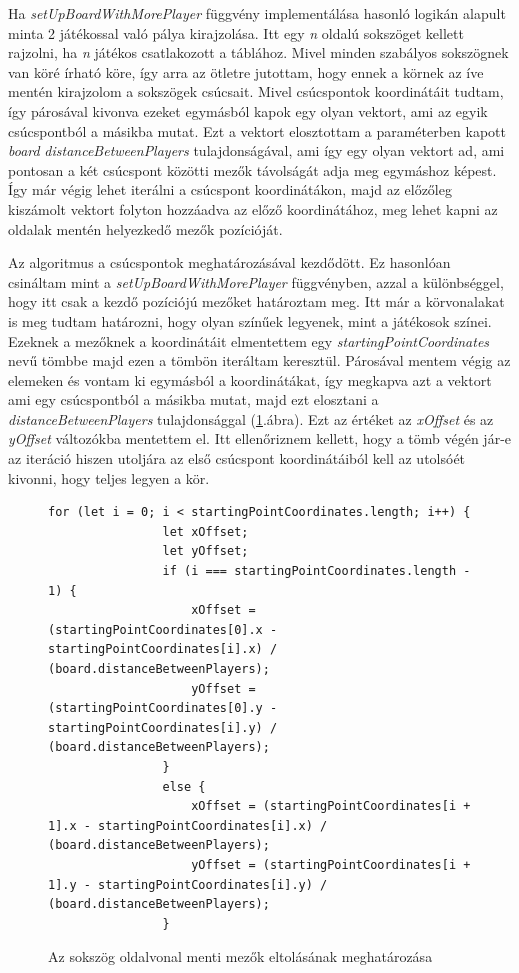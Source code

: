 \documentclass[a4paper,twoside]{article}
\begin{document}
Ha \textit{setUpBoardWithMorePlayer} függvény implementálása hasonló logikán alapult minta 2 játékossal való pálya kirajzolása. Itt egy \textit{n} oldalú sokszöget kellett rajzolni, ha \textit{n} játékos csatlakozott a táblához. Mivel minden szabályos sokszögnek van köré írható köre, így arra az ötletre jutottam, hogy ennek a körnek az íve mentén kirajzolom a sokszögek csúcsait. Mivel csúcspontok koordinátáit tudtam, így párosával kivonva ezeket egymásból kapok egy olyan vektort, ami az egyik csúcspontból a másikba mutat. Ezt a vektort elosztottam a paraméterben kapott \textit{board} \textit{distanceBetweenPlayers} tulajdonságával, ami így egy olyan vektort ad, ami pontosan a két csúcspont közötti mezők távolságát adja meg egymáshoz képest. Így már végig lehet iterálni a csúcspont koordinátákon, majd az előzőleg kiszámolt vektort folyton hozzáadva az előző koordinátához, meg lehet kapni az oldalak mentén helyezkedő mezők pozícióját.
 
Az algoritmus a csúcspontok meghatározásával kezdődött. Ez hasonlóan csináltam mint a \textit{setUpBoardWithMorePlayer} függvényben, azzal a különbséggel, hogy itt csak a kezdő pozíciójú mezőket határoztam meg. Itt már a körvonalakat is meg tudtam határozni, hogy olyan színűek legyenek, mint a játékosok színei. Ezeknek a mezőknek a koordinátáit elmentettem egy \textit{startingPointCoordinates} nevű tömbbe majd ezen a tömbön iteráltam keresztül. Párosával mentem végig az elemeken és vontam ki egymásból a koordinátákat, így megkapva azt a vektort ami egy csúcspontból a másikba mutat, majd ezt elosztani a \textit{distanceBetweenPlayers} tulajdonsággal (\ref{xOffsetMeghat}.ábra). Ezt az értéket az \textit{xOffset} és az \textit{yOffset} változókba mentettem el. Itt ellenőriznem kellett, hogy a tömb végén jár-e az iteráció hiszen utoljára az első csúcspont koordinátáiból kell az utolsóét kivonni, hogy teljes legyen a kör. 
 
\begin{figure}
	\caption{Az sokszög oldalvonal menti mezők eltolásának meghatározása}
	\begin{minipage}{\textwidth}
		\begin{lstlisting}[style=javascriptStyle]
			    for (let i = 0; i < startingPointCoordinates.length; i++) {
				let xOffset;
				let yOffset;
				if (i === startingPointCoordinates.length - 1) {
					xOffset = (startingPointCoordinates[0].x - startingPointCoordinates[i].x) / (board.distanceBetweenPlayers);
					yOffset = (startingPointCoordinates[0].y - startingPointCoordinates[i].y) / (board.distanceBetweenPlayers);
				}
				else {
					xOffset = (startingPointCoordinates[i + 1].x - startingPointCoordinates[i].x) / (board.distanceBetweenPlayers);
					yOffset = (startingPointCoordinates[i + 1].y - startingPointCoordinates[i].y) / (board.distanceBetweenPlayers);
				}
		\end{lstlisting}
	\end{minipage}
	
	\label{xOffsetMeghat}
\end{figure}
\FloatBarrier
\end{document}
